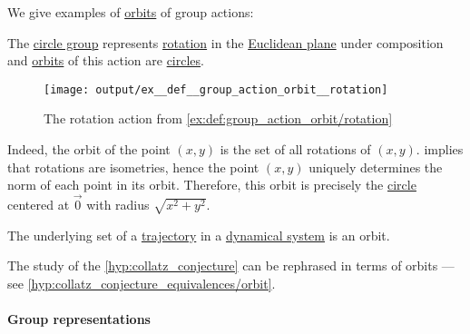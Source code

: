 \begin{example}\label{ex:def:group_action_orbit}
  We give examples of \hyperref[def:group_action_orbit]{orbits} of group actions:
  \begin{thmenum}
     The \hyperref[def:circle_group]{circle group} represents \hyperref[def:rigid_motion/rotation]{rotation} in the \hyperref[def:euclidean_plane]{Euclidean plane} under composition and \hyperref[def:group_action_orbit]{orbits} of this action are \hyperref[def:circle]{circles}.

    \begin{figure}
      \centering
      \texttt{[image: output/ex\_\_def\_\_group\_action\_orbit\_\_rotation]}
      \caption{The rotation action from \cref{ex:def:group_action_orbit/rotation}}
      \label{fig:ex:def:group_action_orbit/rotation}
    \end{figure}

    Indeed, the orbit of the point \( (x, y) \) is the set of all rotations of \( (x, y) \).  implies that rotations are isometries, hence the point \( (x, y) \) uniquely determines the norm of each point in its orbit. Therefore, this orbit is precisely the \hyperref[def:circle]{circle} centered at \( \vec 0 \) with radius \( \sqrt{x^2 + y^2} \).

     The underlying set of a \hyperref[def:dynamical_system_trajectory]{trajectory} in a \hyperref[def:dynamical_system]{dynamical system} is an orbit.

     The study of the \cref{hyp:collatz_conjecture} can be rephrased in terms of orbits --- see \cref{hyp:collatz_conjecture_equivalences/orbit}.
  \end{thmenum}
\end{example}

\paragraph{Group representations}

